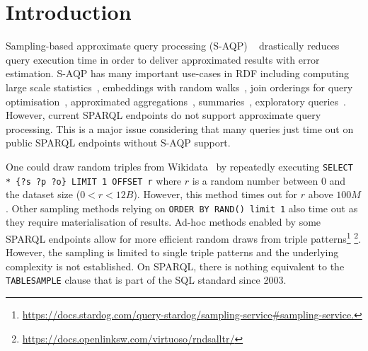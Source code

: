 
\section{Introduction}

Sampling-based approximate query processing (S-AQP)
~\cite{DBLP:conf/sigmod/AgarwalMKTJMMS14} drastically reduces query
execution time in order to deliver approximated results with error
estimation. S-AQP has many important use-cases in RDF including
computing large scale
statistics~\cite{soulet2019anytime,10.1007/978-3-319-18818-8_14},
embeddings with random walks~\cite{ristoski2016rdf2vec}, join
orderings for query optimisation~\cite{DBLP:conf/cidr/LeisRGK017},
approximated
aggregations~\cite{DBLP:journals/tods/LiWYZ19,wang2022approximate},
summaries~\cite{10.1007/978-3-030-49461-2_10}, exploratory
queries~\cite{DBLP:conf/sigmod/AgarwalMKTJMMS14}.
%
However, current SPARQL endpoints do not support approximate query
processing. This is a major issue considering that many queries just
time out on public SPARQL endpoints without S-AQP support.

\noindent One could draw random triples from
Wikidata~\cite{soulet2019anytime} by repeatedly executing
\texttt{SELECT * \{?s ?p ?o\} LIMIT 1 OFFSET r} where $r$ is a random
number between $0$ and the dataset size ($0<r<12B$). However, this
method times out for $r$ above $100M$. Other sampling methods relying
on \texttt{ORDER BY RAND() limit 1} also time out as they require
materialisation of results. Ad-hoc methods enabled by some SPARQL
endpoints allow for more efficient random draws from triple
patterns\footnote{\url{https://docs.stardog.com/query-stardog/sampling-service\#sampling-service.}}
\footnote{\url{https://docs.openlinksw.com/virtuoso/rndsalltr/}}.
However, the sampling is limited to single triple patterns and the
underlying complexity is not established.  On SPARQL, there is nothing
equivalent to the \texttt{TABLESAMPLE} clause that is part of the SQL
standard since 2003.


